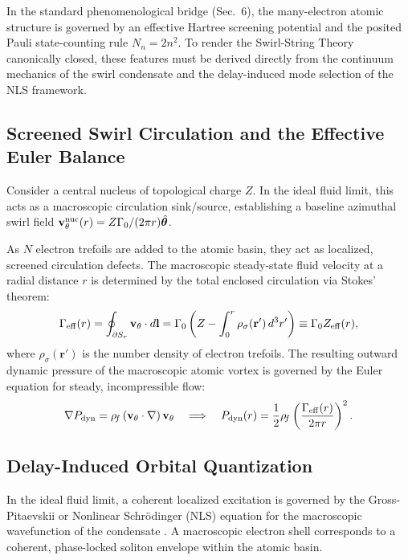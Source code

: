 \documentclass[11pt,a4paper]{article}
\begin{document}
In the standard phenomenological bridge (Sec.~6), the many-electron atomic structure is governed by an effective Hartree screening potential and the posited Pauli state-counting rule $N_n = 2n^2$. To render the Swirl-String Theory canonically closed, these features must be derived directly from the continuum mechanics of the swirl condensate and the delay-induced mode selection of the NLS framework.

\subsection{Screened Swirl Circulation and the Effective Euler Balance}
Consider a central nucleus of topological charge $Z$. In the ideal fluid limit, this acts as a macroscopic circulation sink/source, establishing a baseline azimuthal swirl field $\mathbf{v}_{\theta}^{\rm nuc}(r) = Z \Gamma_0 / (2\pi r) \hat{\boldsymbol{\theta}}$.

As $N$ electron trefoils are added to the atomic basin, they act as localized, screened circulation defects. The macroscopic steady-state fluid velocity at a radial distance $r$ is determined by the total enclosed circulation via Stokes' theorem:
\begin{equation}
\label{eq:GammaEff}
\Gamma_{\rm eff}(r) = \oint_{\partial S_r} \mathbf{v}_{\theta} \cdot d\mathbf{l} = \Gamma_0 \left( Z - \int_0^r \rho_\sigma(\mathbf{r}') \, d^3r' \right) \equiv \Gamma_0 Z_{\rm eff}(r),
\end{equation}
where $\rho_\sigma(\mathbf{r}')$ is the number density of electron trefoils. The resulting outward dynamic pressure of the macroscopic atomic vortex is governed by the Euler equation for steady, incompressible flow:
\begin{equation}
\label{eq:EulerDynamicPressure}
\nabla P_{\rm dyn} = \rho_{\!f} \left( \mathbf{v}_{\theta} \cdot \nabla \right) \mathbf{v}_{\theta} \quad \Longrightarrow \quad P_{\rm dyn}(r) = \frac{1}{2}\rho_{\!f} \left( \frac{\Gamma_{\rm eff}(r)}{2\pi r} \right)^2.
\end{equation}

\subsection{Delay-Induced Orbital Quantization}
In the ideal fluid limit, a coherent localized excitation is governed by the Gross-Pitaevskii or Nonlinear Schr\"odinger (NLS) equation for the macroscopic wavefunction of the condensate \cite{Pitaevskii2003}. A macroscopic electron shell corresponds to a coherent, phase-locked soliton envelope within the atomic basin.
\end{document}
